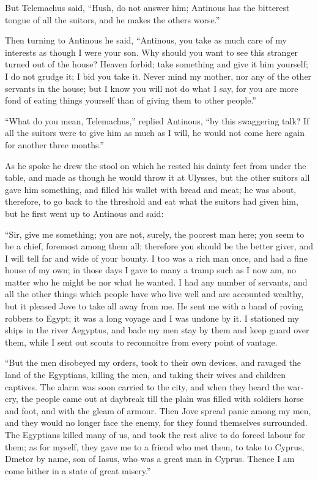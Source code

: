 But Telemachus said, “Hush, do not answer him; Antinous has the bitterest
tongue of all the suitors, and he makes the others worse.”

Then turning to Antinous he said, “Antinous, you take as much care of my
interests as though I were your son. Why should you want to see this stranger
turned out of the house? Heaven forbid; take something and give it him
yourself; I do not grudge it; I bid you take it. Never mind my mother, nor any
of the other servants in the house; but I know you will not do what I say, for
you are more fond of eating things yourself than of giving them to other
people.”

“What do you mean, Telemachus,” replied Antinous, “by this swaggering talk? If
all the suitors were to give him as much as I will, he would not come here
again for another three months.”

As he spoke he drew the stool on which he rested his dainty feet from under the
table, and made as though he would throw it at Ulysses, but the other suitors
all gave him something, and filled his wallet with bread and meat; he was
about, therefore, to go back to the threshold and eat what the suitors had
given him, but he first went up to Antinous and said:

“Sir, give me something; you are not, surely, the poorest man here; you seem to
be a chief, foremost among them all; therefore you should be the better giver,
and I will tell far and wide of your bounty. I too was a rich man once, and had
a fine house of my own; in those days I gave to many a tramp such as I now am,
no matter who he might be nor what he wanted. I had any number of servants, and
all the other things which people have who live well and are accounted wealthy,
but it pleased Jove to take all away from me. He sent me with a band of roving
robbers to Egypt; it was a long voyage and I was undone by it. I stationed my
ships in the river Aegyptus, and bade my men stay by them and keep guard over
them, while I sent out scouts to reconnoitre from every point of vantage.

“But the men disobeyed my orders, took to their own devices, and ravaged the
land of the Egyptians, killing the men, and taking their wives and children
captives. The alarm was soon carried to the city, and when they heard the
war-cry, the people came out at daybreak till the plain was filled with
soldiers horse and foot, and with the gleam of armour. Then Jove spread panic
among my men, and they would no longer face the enemy, for they found
themselves surrounded. The Egyptians killed many of us, and took the rest alive
to do forced labour for them; as for myself, they gave me to a friend who met
them, to take to Cyprus, Dmetor by name, son of Iasus, who was a great man in
Cyprus. Thence I am come hither in a state of great misery.”

